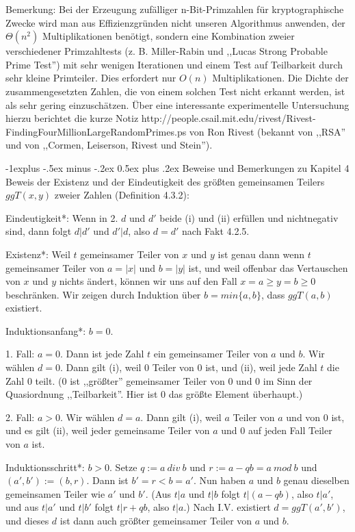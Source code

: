 \documentclass[a4paper]{article}
\makeatletter
\renewcommand{\subsection}{\@startsection{subsection}{2}{0mm}%
 {-1explus -.5ex minus -.2ex}%
 {0.5ex plus .2ex}%
 {\normalfont\normalsize\bfseries}}
\makeatother
\begin{document}
\begin{multicols}{3}
        Bemerkung: Bei der Erzeugung zufälliger n-Bit-Primzahlen für kryptographische Zwecke wird man aus Effizienzgründen nicht unseren Algorithmus anwenden, der $\Theta (n^2)$ Multiplikationen benötigt, sondern eine Kombination zweier verschiedener Primzahltests (z. B. Miller-Rabin und ,,Lucas Strong Probable Prime Test'') mit sehr wenigen Iterationen und einem Test auf Teilbarkeit durch sehr kleine Primteiler. Dies erfordert nur $O(n)$ Multiplikationen. Die Dichte der zusammengesetzten Zahlen, die von einem solchen Test nicht erkannt werden, ist als sehr gering einzuschätzen. Über eine interessante experimentelle Untersuchung hierzu berichtet die kurze Notiz http://people.csail.mit.edu/rivest/Rivest-FindingFourMillionLargeRandomPrimes.ps von Ron Rivest (bekannt von ,,RSA'' und von ,,Cormen, Leiserson, Rivest und Stein'').

        \subsection{Beweise und Bemerkungen zu Kapitel 4}
        Beweis der Existenz und der Eindeutigkeit des größten gemeinsamen Teilers $ggT(x,y)$ zweier Zahlen (Definition 4.3.2):
        \begin{itemize*}
            \item *Eindeutigkeit*: Wenn in 2. $d$ und $d'$ beide (i) und (ii) erfüllen und nichtnegativ sind, dann folgt $d|d'$ und $d'|d$, also $d=d'$ nach Fakt 4.2.5.
            \item  *Existenz*: Weil $t$ gemeinsamer Teiler von $x$ und $y$ ist genau dann wenn $t$ gemeinsamer Teiler von $a=|x|$ und $b=|y|$ ist, und weil offenbar das Vertauschen von $x$ und $y$ nichts ändert, können wir uns auf den Fall $x=a\geq y=b\geq 0$ beschränken. Wir zeigen durch Induktion über $b=min\{a,b\}$, dass $ggT(a,b)$ existiert.
            \item  *Induktionsanfang*: $b=0$.
            \item  1. Fall: $a= 0$. Dann ist jede Zahl $t$ ein gemeinsamer Teiler von $a$ und $b$. Wir wählen $d=0$. Dann gilt (i), weil $0$ Teiler von $0$ ist, und (ii), weil jede Zahl $t$ die Zahl $0$ teilt. ($0$ ist ,,größter'' gemeinsamer Teiler von 0 und 0 im Sinn der Quasiordnung ,,Teilbarkeit''. Hier ist 0 das größte Element überhaupt.)
            \item  2. Fall: $a >0$. Wir wählen $d=a$. Dann gilt (i), weil $a$ Teiler von $a$ und von 0 ist, und es gilt (ii), weil jeder gemeinsame Teiler von $a$ und 0 auf jeden Fall Teiler von $a$ ist.
            \item  *Induktionsschritt*: $b>0$. Setze $q:=a\ div\ b$ und $r:=a-qb=a\ mod\ b$ und $(a',b'):=(b,r)$. Dann ist $b'=r < b=a'$. Nun haben $a$ und $b$ genau dieselben gemeinsamen Teiler wie $a'$ und $b'$. (Aus $t|a$ und $t|b$ folgt $t|(a-qb)$, also $t|a'$, und aus $t|a'$ und $t|b'$ folgt $t|r+qb$, also $t|a$.) Nach I.V. existiert $d= ggT(a',b')$, und dieses $d$ ist dann auch größter gemeinsamer Teiler von $a$ und $b$.
        \end{itemize*}



\end{multicols}
\end{document}
